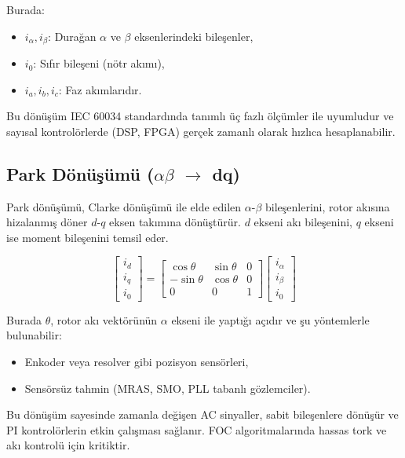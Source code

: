 Burada:
\begin{itemize}
    \item $i_\alpha, i_\beta$: Durağan $\alpha$ ve $\beta$ eksenlerindeki bileşenler,
    \item $i_0$: Sıfır bileşeni (nötr akımı),
    \item $i_a, i_b, i_c$: Faz akımlarıdır.
\end{itemize}

Bu dönüşüm IEC 60034 standardında tanımlı üç fazlı ölçümler ile uyumludur ve sayısal kontrolörlerde (DSP, FPGA) gerçek zamanlı olarak hızlıca hesaplanabilir.

\subsection{Park Dönüşümü ($\alpha\beta$ $\rightarrow$ dq)}

Park dönüşümü, Clarke dönüşümü ile elde edilen $\alpha$-$\beta$ bileşenlerini, rotor akısına hizalanmış döner $d$-$q$ eksen takımına dönüştürür. $d$ ekseni akı bileşenini, $q$ ekseni ise moment bileşenini temsil eder.

\begin{equation}
\begin{bmatrix}
i_d \\
i_q \\
i_0
\end{bmatrix}
=
\begin{bmatrix}
\cos\theta & \sin\theta & 0 \\
-\sin\theta & \cos\theta & 0 \\
0 & 0 & 1
\end{bmatrix}
\begin{bmatrix}
i_\alpha \\
i_\beta \\
i_0
\end{bmatrix}
\end{equation}

Burada $\theta$, rotor akı vektörünün $\alpha$ ekseni ile yaptığı açıdır ve şu yöntemlerle bulunabilir:
\begin{itemize}
    \item Enkoder veya resolver gibi pozisyon sensörleri,
    \item Sensörsüz tahmin (MRAS, SMO, PLL tabanlı gözlemciler).
\end{itemize}

Bu dönüşüm sayesinde zamanla değişen AC sinyaller, sabit bileşenlere dönüşür ve PI kontrolörlerin etkin çalışması sağlanır. FOC algoritmalarında hassas tork ve akı kontrolü için kritiktir.

